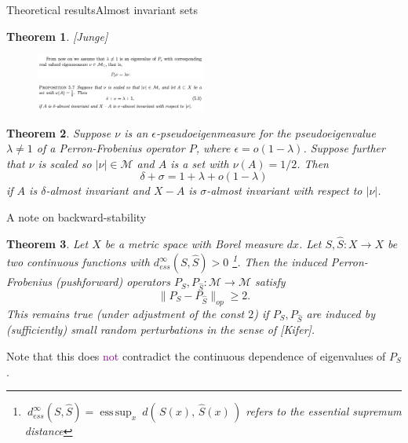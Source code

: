 \documentclass[
  english,            %
  aspectratio=169,    %
]{tumbeamer}
\newtheorem{theorem}{Theorem}
\newenvironment{emphbox}
  {\begin{tcolorbox}[colback=blue!5!white,colframe=blue!75!black]}
  {\end{tcolorbox}}
\newcommand{\cM}{\mathcal{M}}
\renewcommand{\emph}[1]{\textcolor{purple}{#1}}
\DeclareMathOperator*{\esssup}{ess\,sup}
\begin{document}
\begin{frame}{Theoretical results}{Almost invariant sets}
  
\begin{theorem}

  [Junge]
\end{theorem}
\begin{figure}
  \centering
  \includegraphics[width=0.5\textwidth]{almost_inv_1.png}
  \includegraphics[width=0.5\textwidth]{almost_inv_2.png}
\end{figure}

\begin{theorem}
  Suppose $\nu$ is an $\epsilon$-pseudoeigenmeasure for the pseudoeigenvalue $\lambda \neq 1$ of a Perron-Frobenius operator $P$, where $\epsilon = o (1 - \lambda)$. Suppose further that $\nu$ is scaled so $| \nu | \in \cM$ and $A$ is a set with $\nu (A) = 1/2$. Then 
  \begin{equation}
    \delta + \sigma = 1 + \lambda + o (1 - \lambda)
  \end{equation}
  if $A$ is $\delta$-almost invariant and $X - A$ is $\sigma$-almost invariant with respect to $| \nu |$. 
\end{theorem}

\end{frame}

\begin{frame}{A note on backward-stability}
  
\begin{theorem}
  Let $X$ be a metric space with Borel measure $dx$. Let $S,\hat{S} : X \to X$ be two continuous functions with $ d_{ess}^\infty (S, \hat{S}) > 0 $ \footnote{$\ d_{ess}^\infty (S, \hat{S}) = \esssup_{x}\ d(\, S(x),\, \hat{S}(x)\, )$ refers to the essential supremum distance}. Then the induced Perron-Frobenius (pushforward) operators $P_S, P_{\hat{S}} : \cM \to \cM$ satisfy 
  \begin{equation}
    \| P_S - P_{\hat{S}} \|_{op} \geq 2 . 
  \end{equation}
  This remains true (under adjustment of the const $2$) if $P_S, P_{\hat{S}}$ are induced by (sufficiently) small random perturbations in the sense of [Kifer]. 
\end{theorem}

\begin{emphbox}
  Note that this does \emph{not} contradict the continuous dependence of eigenvalues of $P_S$. 
\end{emphbox}

\end{frame}
\end{document}
